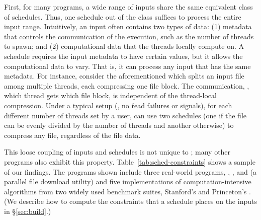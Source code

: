 First, for many programs, a wide range of inputs share the same equivalent
class of schedules.  Thus, one schedule out of the class suffices to
process the entire input range.  Intuitively, an input often contains two
types of data: (1) metadata that controls the communication of the
execution, such as the number of threads to spawn; and (2) computational
data that the threads locally compute on.  A schedule requires the input
metadata to have certain values, but it allows the computational data to vary.
That is, it can process any input that has the same metadata.  For instance,
consider the aforementioned \pbzip which splits an input file
among multiple threads, each compressing one file block.  The
communication, \ie, which thread gets which file block, is independent of
the thread-local compression. Under a typical setup (\eg, no \v{read}
failures or signals), for each different number of threads set by a user, \pbzip can use two
schedules (one if the file can be evenly divided by the number of threads and another otherwise) to
compress any file, regardless of the file data.


This loose coupling of inputs and schedules is not unique to \pbzip; many
other programs also exhibit this property.
Table~\ref{tab:sched-constraints} shows a sample of our findings.  The
programs shown include three real-world programs, \apache, \pbzip, and
\aget (a parallel file download utility) and five implementations of
computation-intensive algorithms from two widely used benchmark suites,
Stanford's \splash and Princeton's \parsec.  (We describe
how to compute the constraints that a schedule places on the inputs in \S\ref{sec:build}.)





